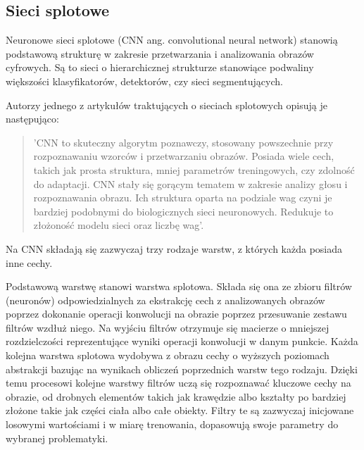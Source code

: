 
  \subsection{Sieci splotowe}
    \label{sieci_splotowe}

    Neuronowe sieci splotowe (CNN ang. convolutional neural network) stanowią podstawową strukturę w zakresie przetwarzania i analizowania obrazów cyfrowych. Są to sieci o hierarchicznej strukturze stanowiące podwaliny większości klasyfikatorów, detektorów, czy sieci segmentujących.

    Autorzy jednego z artykułów traktujących o sieciach splotowych \cite{cnn} opisują je następująco:
    \begin{quote}
      'CNN to skuteczny algorytm poznawczy, stosowany powszechnie przy rozpoznawaniu wzorców i przetwarzaniu obrazów. Posiada wiele cech, takich jak prosta struktura, mniej parametrów treningowych, czy zdolność do adaptacji. CNN stały się gorącym tematem w zakresie analizy głosu i rozpoznawania obrazu. Ich struktura oparta na podziale wag czyni je bardziej podobnymi do biologicznych sieci neuronowych. Redukuje to złożoność modelu sieci oraz liczbę wag'.
    \end{quote}

    Na CNN składają się zazwyczaj trzy rodzaje warstw, z których każda posiada inne cechy.

    Podstawową warstwę stanowi warstwa splotowa. Składa się ona ze zbioru filtrów (neuronów) odpowiedzialnych za ekstrakcję cech z analizowanych obrazów poprzez dokonanie operacji
    konwolucji na obrazie poprzez przesuwanie zestawu filtrów wzdłuż niego.
    Na wyjściu filtrów otrzymuje się macierze o mniejszej rozdzielczości
    reprezentujące wyniki operacji konwolucji w danym punkcie. Każda kolejna warstwa splotowa wydobywa z obrazu cechy o wyższych poziomach abstrakcji
    bazując na wynikach obliczeń poprzednich warstw tego rodzaju. Dzięki temu
    procesowi kolejne warstwy filtrów uczą się
    rozpoznawać kluczowe cechy na obrazie, od drobnych elementów takich jak
    krawędzie albo kształty po bardziej złożone takie jak części ciała albo
    całe obiekty. Filtry te są zazwyczaj inicjowane losowymi wartościami i w miarę trenowania, dopasowują swoje parametry do wybranej problematyki.

